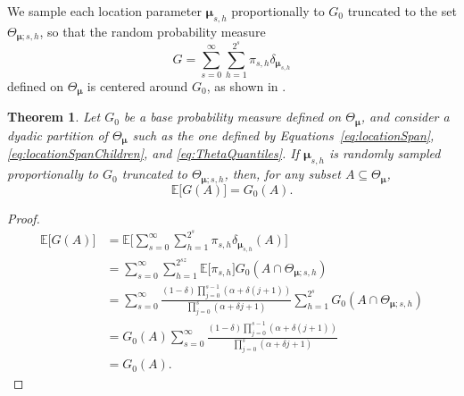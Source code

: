 \documentclass[nonatbib]{elsarticle}
\newtheorem{theorem}{Theorem}
\begin{document}
We sample each location parameter $\bm{\mu}_{s,h}$ proportionally to $G_0$ truncated to the set $\Theta_{\bm{\mu};s,h}$,
so that the random probability measure
\begin{equation}
    \label{eq:randomLocationMeasure}
    G = \sum_{s=0}^{\infty }\sum_{h=1}^{2^s} \pi_{s,h} \delta_{\bm{\mu}_{s,h}}
\end{equation}
defined on $\Theta_{\bm{\mu}}$ is centered around $G_0$, as shown in .

\begin{theorem}\label{thm:centeringProperty}
    Let $G_0$ be a base probability measure defined on $\Theta_{\bm{\mu}}$, and consider a dyadic partition of $\Theta_{\bm{\mu}}$ such as the one defined by Equations~\eqref{eq:locationSpan}, \eqref{eq:locationSpanChildren}, and \eqref{eq:ThetaQuantiles}.
    If $\bm{\mu}_{s,h}$ is randomly sampled proportionally to $G_0$ truncated to $\Theta_{\bm{\mu}; s,h}$, then, for any subset $A \subseteq \Theta_{\bm{\mu}}$,
    \begin{equation}
        \label{eq:priorCenteredMeasure}
        \mathbb{E}\big[ G(A) \big] = G_0(A).
    \end{equation}
\end{theorem}

\begin{proof}
    \[
        \begin{aligned}
            \mathbb{E}\big[ G(A) \big] & = \mathbb{E}\Big[  \sum_{s=0}^{\infty }\sum_{h=1}^{2^{s}}\pi_{s,h}\delta_{\bm{\mu}_{s,h}}(A) \Big]
\\
                                               &= \sum_{s=0}^{\infty } \sum_{h=1}^{2^{sz}}\mathbb{E}\big[ \pi_{s,h} \big] G_0(A \cap \Theta_{\bm{\mu};s,h})\\
                                               &= \sum_{s=0}^{\infty } \frac{(1-\delta) \prod_{j=0}^{s-1}(\alpha + \delta(j+1))}{\prod_{j=0}^{s}(\alpha+\delta j +1 )} \sum_{h=1}^{2^{s}} G_0(A \cap \Theta_{\bm{\mu};s,h})\\
                                               &= G_0(A) \sum_{s=0}^{\infty }\frac{(1-\delta) \prod_{j=0}^{s-1}(\alpha + \delta(j+1))}{\prod_{j=0}^{s}(\alpha+\delta j +1 )} \\
                                               &= G_0(A).
        \end{aligned}
    \]

\end{proof}
\end{document}
